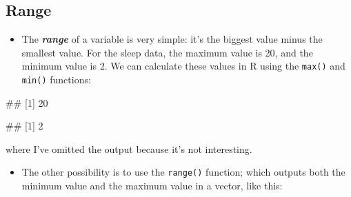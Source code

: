 \documentclass[
]{book}
\newenvironment{Shaded}{\begin{snugshade}}{\end{snugshade}}
\newcommand{\FunctionTok}[1]{\textcolor[rgb]{0.13,0.29,0.53}{\textbf{#1}}}
\newcommand{\NormalTok}[1]{#1}
\newcommand{\SpecialCharTok}[1]{\textcolor[rgb]{0.81,0.36,0.00}{\textbf{#1}}}
\providecommand{\tightlist}{%
  \setlength{\itemsep}{0pt}\setlength{\parskip}{0pt}}
\begin{document}
\hypertarget{range}{%
\subsection{Range}\label{range}}

\begin{itemize}
\tightlist
\item
  The \textbf{\emph{range}} of a variable is very simple: it's the biggest value minus the smallest value. For the sleep data, the maximum value is 20, and the minimum value is 2. We can calculate these values in R using the \texttt{max()} and \texttt{min()} functions:
\end{itemize}

\begin{Shaded}
\end{Shaded}

\begin{Shaded}
\begin{Highlighting}[]
\NormalTok{\#\# [1] 20}
\end{Highlighting}
\end{Shaded}

\begin{Shaded}
\end{Shaded}

\begin{Shaded}
\begin{Highlighting}[]
\NormalTok{\#\# [1] 2}
\end{Highlighting}
\end{Shaded}

where I've omitted the output because it's not interesting.

\begin{itemize}
\tightlist
\item
  The other possibility is to use the \texttt{range()} function; which outputs both the minimum value and the maximum value in a vector, like this:
\end{itemize}

\begin{Shaded}
\end{Shaded}
\end{document}
